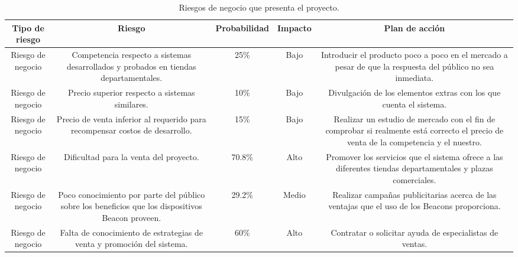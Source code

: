 \begin{table}[htb]
\setlength\extrarowheight{2pt} %
\begin{tabularx}{\textwidth}{|C|C|C|C|C|}
\hline
\textbf{Tipo de riesgo} & \textbf{Riesgo} & \textbf{Probabilidad}  & \textbf{Impacto}  & \textbf{Plan de acción}
\\ \hline
Riesgo de negocio & Competencia respecto a sistemas desarrollados y probados en tiendas departamentales. & 25\% & Bajo & Introducir el producto poco a poco en el mercado a pesar de que la respuesta del público no sea inmediata.
\\ \hline
Riesgo de negocio & Precio superior respecto a sistemas similares. & 10\% & Bajo & Divulgación de los elementos extras con los que cuenta el sistema.
\\ \hline
Riesgo de negocio & Precio de venta inferior al requerido para recompensar costos de desarrollo. & 15\% & Bajo & Realizar un estudio de mercado con el fin de comprobar si realmente está correcto el precio de venta de la competencia y el nuestro.
\\ \hline
Riesgo de negocio & Dificultad para la venta del proyecto. & 70.8\% & Alto & Promover los servicios que el sistema ofrece a las diferentes tiendas departamentales y plazas comerciales.
\\ \hline
Riesgo de negocio & Poco conocimiento por parte del público sobre los beneficios que los dispositivos Beacon proveen. & 29.2\% & Medio & Realizar campañas publicitarias acerca de las ventajas que el uso de los Beacons proporciona.
\\ \hline
Riesgo de negocio & Falta de conocimiento de estrategias de venta y promoción del sistema. & 60\% & Alto & Contratar o solicitar ayuda de especialistas de ventas.
\\ \hline
\end{tabularx}
\caption{Riesgos de negocio que presenta el proyecto. }
\label{table:riesgosnegocio}
\end{table}

